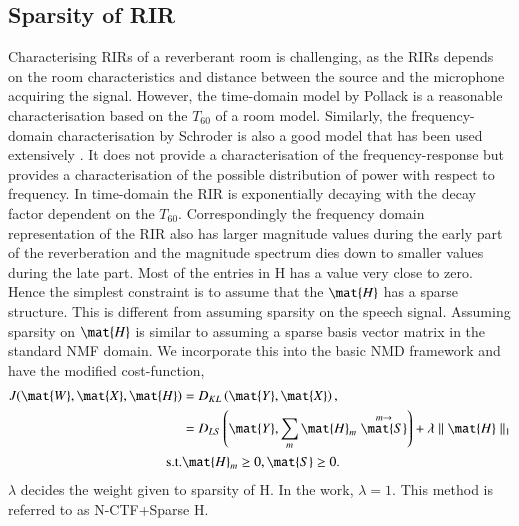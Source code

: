 \subsection{Sparsity of RIR}
\label{ssec:sparse_RIR}
Characterising RIRs of a reverberant room is challenging, as the RIRs depends on the room characteristics and distance between the source and the microphone acquiring the signal. However, the time-domain model by Pollack is a reasonable
characterisation based on the $T_{60}$ of a room model. Similarly, the
frequency-domain characterisation by Schroder is also a good model that has been
used extensively \cite{naylor2010speech}. It does not provide a characterisation of the
frequency-response but provides a characterisation of the possible distribution
of power with respect to frequency. In time-domain the RIR is exponentially
decaying with the decay factor dependent on the $T_{60}$. Correspondingly the
frequency domain representation of the RIR also has larger magnitude values
during the early part of the reverberation and the magnitude spectrum dies down
to smaller values during the late part. Most of the entries in H has a value very close to zero. Hence the simplest constraint is to
assume that the $\mat{H}$ has a sparse structure. This is different from
assuming sparsity on the speech signal. Assuming sparsity on $\mat{H}$ is
similar to assuming a sparse basis vector matrix in the standard NMF domain. We incorporate this into the basic NMD framework and have the modified
cost-function,
\begin{align}
  J(\mat{W}, \mat{X},\mat{H}) &= D_{KL}\left(\mat{Y}, \mat{X}\right),\\
  &= D_{LS}\left(\mat{Y}, \sum_{m} \mat{H}_m \stackrel{m\rightarrow}{\mat{S}}\right)
  + \lambda \parallel \mat{H} \parallel_1 \\
  \text{s.t.} & \mat{H}_m \ge 0, \mat{S} \ge 0.
  \label{eqn:NMFD_NMFcost_prop1}
\end{align}
$\lambda$ decides the weight given to sparsity of H. In the work, $\lambda = 1$. This method is referred to as N-CTF+Sparse H.

